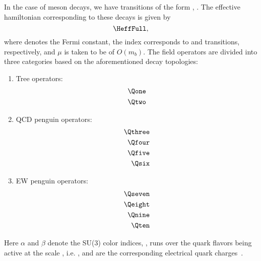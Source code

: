In the case of \B meson decays, we have transitions of the form \DbEqOne, \DcEqDuEqZero. The effective hamiltonian corresponding to these decays is given by
\begin{equation}
\HeffFull,
\end{equation}
where \GF denotes the Fermi constant, the index \qqInds corresponds to \bd and \bs transitions, respectively, and $\mu$ is taken to be of $O(m_{b})$. The field operators are divided into three categories based on the aforementioned decay topologies:
\begin{enumerate}
\item{Tree operators:}
\begin{eqnarray}
\Qone \nonumber \\
\Qtwo 
\end{eqnarray}

\item{QCD penguin operators:}
\begin{eqnarray}
\Qthree \nonumber \\
\Qfour \nonumber \\
\Qfive \nonumber \\
\Qsix 
\end{eqnarray}

\item{EW penguin operators:}
\begin{eqnarray}
\Qseven \nonumber \\
\Qeight \nonumber \\
\Qnine \nonumber \\
\Qten
\end{eqnarray}
\end{enumerate}
Here $\alpha$ and $\beta$ denote the SU(3) color indices, \qqdef, \qqp runs over the quark flavors being active at the scale \muOmb, i.e. \qqpInudcs, and \eqqp are the corresponding electrical quark charges~\cite{Fleischer}.

